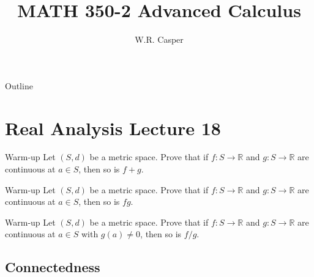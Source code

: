\documentclass{beamer}
\title{MATH 350-2 Advanced Calculus}
\subtitle
{} %
\author[W.R. Casper] %
{W.R. Casper}
\institute[California State University Fullerton] %
{
  Department of Mathematics\\
  California State University Fullerton}
\begin{document}
\begin{frame}
  \titlepage
\end{frame}

\begin{frame}{Outline}
  \tableofcontents
\end{frame}



\section{Real Analysis Lecture 18}

\begin{frame}{Warm-up}
Let $(S,d)$ be a metric space.
Prove that if $f: S\rightarrow \mathbb{R}$ and $g: S\rightarrow\mathbb{R}$ are continuous at $a\in S$, then so is $f + g$.
\end{frame}

\begin{frame}{Warm-up}
Let $(S,d)$ be a metric space.
Prove that if $f: S\rightarrow \mathbb{R}$ and $g: S\rightarrow\mathbb{R}$ are continuous at $a\in S$, then so is $fg$.
\end{frame}

\begin{frame}{Warm-up}
Let $(S,d)$ be a metric space.
Prove that if $f: S\rightarrow \mathbb{R}$ and $g: S\rightarrow\mathbb{R}$ are continuous at $a\in S$ with $g(a)\neq 0$, then so is $f/g$.
\end{frame}

\subsection{Connectedness}
\end{document}
